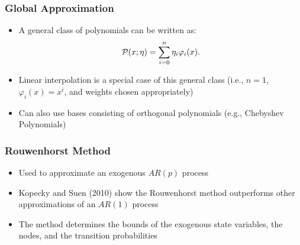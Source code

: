 \documentclass[11pt]{beamer}
\begin{document}

\begin{frame}\frametitle{Global Approximation}

\begin{itemize}\setlength{\itemsep}{10pt}
  \item <1-|handout:1>A general class of polynomials can be written as:
  \begin{gather*}
  {\cal{P}}(x;\eta) = \sum_{i=0}^n\eta_i\varphi_i(x).
  \end{gather*}
  \item <2-|handout:1>Linear interpolation is a special case of this general class (i.e., $n=1$, $\varphi_i(x)=x^i$, and weights chosen appropriately)
  \item <3-|handout:1>Can also use bases consisting of orthogonal polynomials (e.g., Chebyshev Polynomials)
\end{itemize}

\end{frame}


\begin{frame}\frametitle{Rouwenhorst Method}

\begin{itemize}\setlength{\itemsep}{12pt}
  \item<1-|handout:1> Used to approximate an exogenous $AR(p)$ process
  \item <2-|handout:1>Kopecky and Suen (2010) show the Rouwenhorst method outperforms other approximations of an $AR(1)$ process
  \item <3-|handout:1>The method determines the bounds of the exogenous state variables, the nodes, and the transition probabilities
\end{itemize}
\end{frame}

\end{document}
